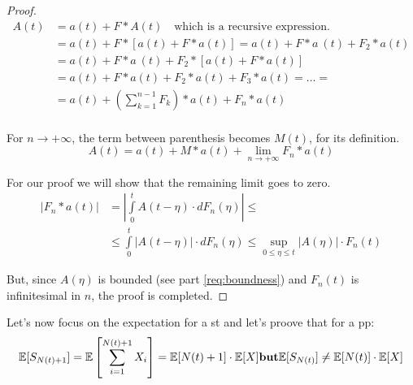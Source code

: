 \begin{proof}
	\begin{equation}\begin{split}
		A(t) &= a(t) + F \ast A(t) \quad \text{which is a recursive expression.} \\
		&= a(t) + F \ast \left[a(t) + F \ast a(t) \right] = a(t) + F \ast a ~ (t) + F_2 \ast a(t) \\
		&= a(t) + F \ast a ~ (t) + F_2 \ast \left[a(t) + F \ast a(t) \right] \\
		&= a(t) + F \ast a(t) + F_2 \ast a(t) + F_3 \ast a(t) = \dots  = \\
		&= a(t) + \left( \sum\limits_{k=1}^{n-1}F_k\right) \ast a(t) + F_n \ast a(t) \\
	\end{split} \end{equation}

	For $n \to +\infty$, the term between parenthesis becomes $M(t)$, for its definition.
	\begin{equation}
		A(t) = a(t) + M \ast a(t) + \lim_{n \to +\infty} F_n \ast a(t)
	\end{equation}

	For our proof we will show that the remaining limit goes to zero.
	\begin{equation} \begin{split}
		|F_n \ast a(t)| & = \left| \int\limits_0^{t}A(t-\eta) \cdot dF_n(\eta) \right| \le \\
		& \le \int\limits_0^{t}|A(t-\eta)| \cdot dF_n(\eta) \le \sup\limits_{0 \le \eta \le t} |A(\eta)| \cdot F_n (t)
	\end{split}\end{equation}

	But, since $A(\eta)$ is bounded (see part \ref{req:boundness}) and $F_n(t)$ is infinitesimal in $n$, the proof is completed.
\end{proof}

\remark
Let's now focus on the expectation for a \gls{st} and let's proove that for a \gls{pp}:
\begin{equation}
	\exp[S_{N(t)+1}] = \exp\left[\sum\limits_{i=1}^{N(t)+1}X_i\right] = \exp[N(t)+1]\cdot \exp[X] \text{\textbf{but}} \exp[S_{N(t)}] \neq \exp[N(t)]\cdot \exp[X]
\end{equation}

